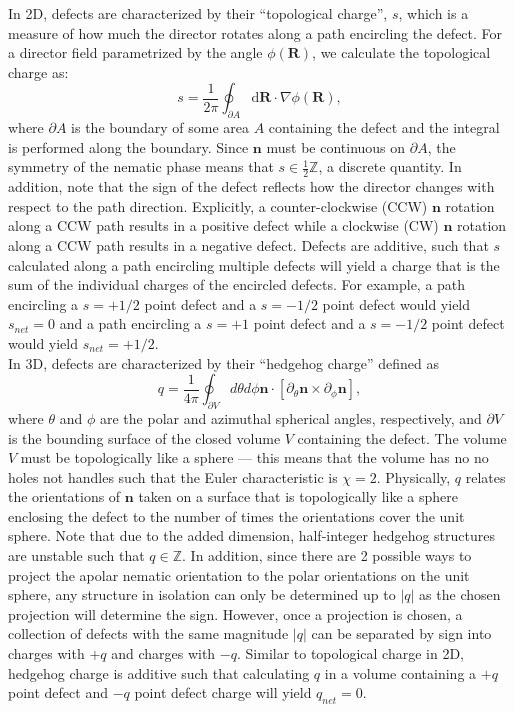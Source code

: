In 2D, defects are characterized by their ``topological charge'', $s$, which is a measure of how much the director rotates along a path encircling the defect.
For a director field parametrized by the angle $\phi(\mathbf{R})$, we calculate the topological charge as:
\begin{equation}
  s = \frac{1}{2 \pi}\oint_{\partial A} \textrm{d}\mathbf{R} \cdot \nabla\phi(\mathbf{R}),\label{eq:2-topCharge}
\end{equation}
where $\partial A$ is the boundary of some area $A$ containing the defect and the integral is performed along the boundary.
Since $\mathbf{n}$ must be continuous on $\partial A$, the symmetry of the nematic phase means that $s \in \frac{1}{2} \mathbb{Z}$, a discrete quantity.
In addition, note that the sign of the defect reflects how the director changes with respect to the path direction.
Explicitly, a counter-clockwise (CCW) $\mathbf{n}$ rotation along a CCW path results in a positive defect while a clockwise (CW) $\mathbf{n}$ rotation along a CCW path results in a negative defect.
Defects are additive, such that $s$ calculated along a path encircling multiple defects will yield a charge that is the sum of the individual charges of the encircled defects.
For example, a path encircling a $s = +1/2$ point defect and a $s = -1/2$ point defect would yield $s_{net} = 0$ and a path encircling a $s = +1$ point defect and a $s = -1/2$ point defect would yield $s_{net}= +1/2$.\\

In 3D, defects are characterized by their ``hedgehog charge'' defined as
\begin{equation}
  q = \frac{1}{4 \pi} \oint_{\partial V}d \theta d \phi \mathbf{n} \cdot \left [ \partial_{\theta} \mathbf{n} \times \partial_{\phi} \mathbf{n} \right ],\label{e:2-hedCharge}
\end{equation}
 where $\theta$ and $\phi$ are the polar and azimuthal spherical angles, respectively, and $\partial V$ is the bounding surface of the closed volume $V$ containing the defect.
The volume $V$ must be topologically like a sphere --- this means that the volume has no no holes not handles such that the Euler characteristic is $\chi = 2$.
Physically, $q$ relates the orientations of $\mathbf{n}$ taken on a surface that is topologically like a sphere enclosing the defect to the number of times the orientations cover the unit sphere.
Note that due to the added dimension, half-integer hedgehog structures are unstable such that $q \in \mathbb{Z}$.
In addition, since there are 2 possible ways to project the apolar nematic orientation to the polar orientations on the unit sphere, any structure in isolation can only be determined up to $|q|$ as the chosen projection will determine the sign.
However, once a projection is chosen, a collection of defects with the same magnitude $|q|$ can be separated by sign into charges with $+q$ and charges with $-q$.
Similar to topological charge in 2D, hedgehog charge is additive such that calculating $q$ in a volume containing a $+q$ point defect and $-q$ point defect charge will yield $q_{net} = 0$. \\

